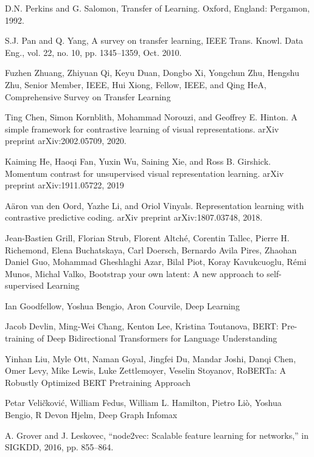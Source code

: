 \documentclass{beamer}
\begin{document}
\begin{thebibliography}{...}
     D.N. Perkins and G. Salomon, Transfer of Learning. 
    Oxford, England: Pergamon, 1992. 

     S.J. Pan and Q. Yang, A survey on transfer learning, 
    IEEE Trans. Knowl. Data Eng., vol. 22, no. 10, pp. 1345–1359, Oct. 2010.

     Fuzhen Zhuang, Zhiyuan Qi, Keyu Duan, Dongbo Xi, Yongchun Zhu, 
    Hengshu Zhu, Senior Member, IEEE, Hui Xiong, Fellow, IEEE, and Qing HeA, 
    Comprehensive Survey on Transfer Learning

     Ting Chen, Simon Kornblith, Mohammad Norouzi, 
    and Geoffrey E. Hinton. 
    A simple framework for contrastive learning of visual representations. 
    arXiv preprint arXiv:2002.05709, 2020.

     Kaiming He, Haoqi Fan, Yuxin Wu, Saining Xie, and Ross 
    B. Girshick. 
    Momentum contrast for unsupervised visual representation learning. 
    arXiv preprint arXiv:1911.05722, 2019

     Aäron van den Oord, Yazhe Li, and Oriol Vinyals. 
    Representation learning with contrastive predictive coding. 
    arXiv preprint arXiv:1807.03748, 2018.
                            
     Jean-Bastien Grill, Florian Strub, 
    Florent Altché, Corentin Tallec, Pierre H. Richemond, Elena Buchatskaya, 
    Carl Doersch, Bernardo Avila Pires, Zhaohan Daniel Guo, 
    Mohammad Gheshlaghi Azar, Bilal Piot, Koray Kavukcuoglu, 
    Rémi Munos, Michal Valko, 
    Bootstrap your own latent: A new approach to self-supervised Learning

     Ian Goodfellow, Yoshua Bengio, Aron Courvile, 
    Deep Learning

     Jacob Devlin, Ming-Wei Chang, Kenton Lee, 
    Kristina Toutanova, 
    BERT: Pre-training of Deep Bidirectional Transformers for Language Understanding

     Yinhan Liu, Myle Ott, Naman Goyal, Jingfei Du, Mandar Joshi, 
    Danqi Chen, Omer Levy, Mike Lewis, Luke Zettlemoyer, Veselin Stoyanov, 
    RoBERTa: A Robustly Optimized BERT Pretraining Approach

     Petar Veličković, William Fedus, William L. Hamilton, 
    Pietro Liò, Yoshua Bengio, R Devon Hjelm, 
    Deep Graph Infomax

     A. Grover and J. Leskovec, 
    “node2vec: Scalable feature learning for networks,” in SIGKDD, 2016, pp. 855–864. 


\end{thebibliography}
\end{document}
